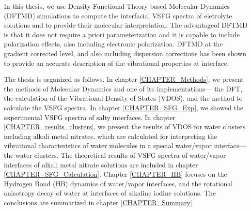 In this thesis, we use Density Functional Theory-based Molecular Dynamics (DFTMD) simulations to compute 
the interfacial VSFG spectra of eletrolyte solutions and to provide their molecular interpretation.
The advantageof DFTMD is that it does not require a priori parameterization and it is capable to include polarization effects, \cite{Ufimtsev2011}
also including electronic polarization. DFTMD at the gradient corrected level, and also including dispersion corrections \cite{Grimme04,Grimme06,Grimme07,Grimme10,Baer2011}
has been shown to provide an accurate description of the vibrational properties at interface. \cite{Fornaro2015}

The thesis is organized as follows. 
In chapter \ref{CHAPTER_Methods}, we present the methods of \abinitio Molecular Dynamics and one of its implementations--- 
the DFT, the calculation of the Vibrational Density of States (VDOS), and the method to calculate the VSFG spectra.
In chapter \ref{CHAPTER_SFG_Exp}, we showed the experimental VSFG spectra of salty interfaces.
In chapter \ref{CHAPTER_results_clusters}, we present the results of VDOS for water clusters including alkali metal nitrates, 
 which are calculated for interpreting the vibrational characteristics of water molecules in a special water/vapor interface---the water clusters.
The theoretical results of VSFG spectra of water/vapor interfaces of alkali metal nitrate solutions are included in chapter \ref{CHAPTER_SFG_Calculation}. 
Chapter \ref{CHAPTER_HB} focuses on the Hydrogen Bond (HB) dynamics of water/vapor interfaces, 
and the rotational anisotropy decay of water at interfaces of alkaline iodine solutions. 
The conclusions are summarized in chapter \ref{CHAPTER_Summary}.
